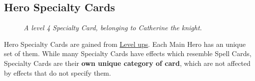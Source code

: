 \subsection*{\hypertarget{Specialty}{Hero Specialty Cards}}

\begin{wrapfigure}{r}{0.5\textwidth}
  \centering
  \caption[hero specialty]{\scriptsize\textit{A level 4 Specialty Card, belonging to Catherine the knight.}}
\end{wrapfigure}
Hero Specialty Cards are gained from \hyperlink{Level}{Level ups}.
Each Main Hero has an unique set of them.
While many Specialty Cards have effects which resemble Spell Cards, Specialty Cards are their \textbf{own unique category of card}, which are not affected by effects that do not specify them.
\par
